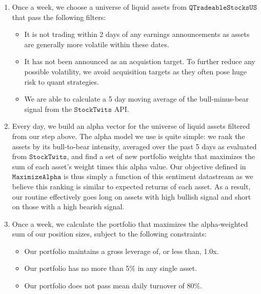\documentclass[11pt,]{article}
\providecommand{\tightlist}{%
\setlength{\itemsep}{0pt}\setlength{\parskip}{0pt}}
\begin{document}
\begin{enumerate}
\def\labelenumi{\arabic{enumi}.}
\tightlist
\item
  Once a week, we choose a universe of liquid assets from
  \(\texttt{QTradeableStocksUS}\) that pass the following filters:

  \begin{itemize}
  \tightlist
  \item
    It is not trading within 2 days of any earnings announcements as
    assets are generally more volatile within these dates.
  \item
    It has not been announced as an acquistion target. To further reduce
    any possible volatility, we avoid acquisition targets as they often
    pose huge risk to quant strategies.
  \item
    We are able to calculate a 5 day moving average of the
    bull-minus-bear signal from the \(\texttt{StockTwits}\) API.
  \end{itemize}
\item
  Every day, we build an alpha vector for the universe of liquid assets
  filtered from our step above. The alpha model we use is quite simple:
  we rank the assets by its bull-to-bear intensity, averaged over the
  past 5 days as evaluated from \(\texttt{StockTwits}\), and find a set
  of new portfolio weights that maximizes the sum of each asset's weight
  times this alpha value. Our objective defined in
  \(\texttt{MaximizeAlpha}\) is thus simply a function of this sentiment
  datastream as we believe this ranking is similar to expected returns
  of each asset. As a result, our routine effectively goes long on
  assets with high bullish signal and short on those with a high bearish
  signal.\\
\item
  Once a week, we calculate the portfolio that maximizes the
  alpha-weighted sum of our position sizes, subject to the following
  constraints:

  \begin{itemize}
  \tightlist
  \item
    Our portfolio maintains a gross leverage of, or less than, 1.0x.
  \item
    Our portfolio has no more than 5\% in any single asset.
  \item
    Our portfolio does not pass mean daily turnover of 80\%.
  \end{itemize}
\end{enumerate}
\end{document}

